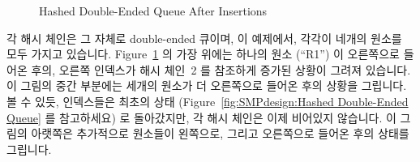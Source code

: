 \begin{figure}[tb]
\begin{center}
\end{center}
\caption{Hashed Double-Ended Queue After Insertions}
\label{fig:SMPdesign:Hashed Double-Ended Queue After Insertions}
\end{figure}

각 해시 체인은 그 자체로 double-ended 큐이며, 이 예제에서, 각각이 네개의 원소를
모두 가지고 있습니다.
Figure~\ref{fig:SMPdesign:Hashed Double-Ended Queue After Insertions} 의 가장
위에는 하나의 원소 (``R1'') 이 오른쪽으로 들어온 후의, 오른쪽 인덱스가 해시
체인~2 를 참조하게 증가된 상황이 그려져 있습니다.
이 그림의 중간 부분에는 세개의 원소가 더 오른쪽으로 들어온 후의 상황을
그립니다.
볼 수 있듯, 인덱스들은 최초의 상태
(Figure~\ref{fig:SMPdesign:Hashed Double-Ended Queue} 를 참고하세요) 로
돌아갔지만, 각 해시 체인은 이제 비어있지 않습니다.
이 그림의 아랫쪽은 추가적으로 원소들이 왼쪽으로, 그리고 오른쪽으로 들어온 후의
상태를 그립니다.
\iffalse

